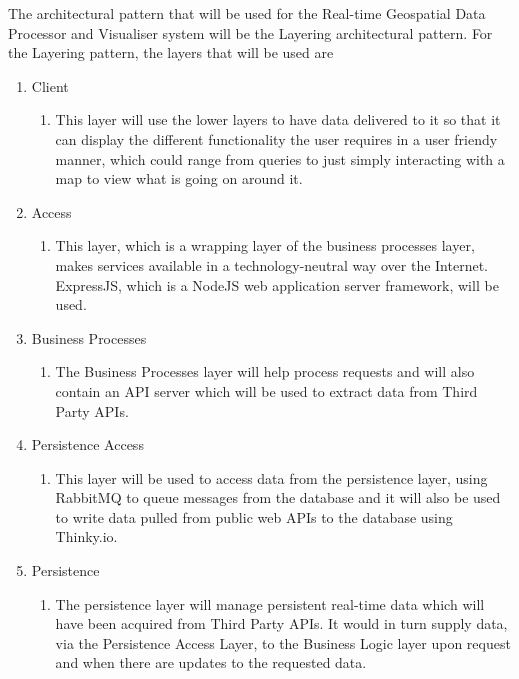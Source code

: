 The architectural pattern that will be used for the Real-time Geospatial Data Processor and Visualiser system will be the Layering architectural pattern. \newline
For the Layering pattern, the layers that will be used are
\begin{enumerate}
	\item Client
		\begin{enumerate}
			\item This layer will use the lower layers to have data delivered to it so that it can display the different functionality the user requires in a user friendy manner, which could range from queries to just simply interacting with a map to view what is going on around it.
		\end{enumerate}
	\item Access
		\begin{enumerate}
			\item This layer, which is a wrapping layer of the business processes layer, makes services available in a technology-neutral way over the Internet. ExpressJS, which is a NodeJS web application server framework, will be used.
		\end{enumerate}
	\item Business Processes
		\begin{enumerate}
			\item The Business Processes layer will help process requests and will also contain an API server which will be used to extract data from Third Party APIs.
		\end{enumerate}
	\item Persistence Access
		\begin{enumerate}
			\item This layer will be used to access data from the persistence layer, using RabbitMQ to queue messages from the database and it will also be used to write data pulled from public web APIs to the database using Thinky.io.
		\end{enumerate}
	\item Persistence
		\begin{enumerate}
			\item The persistence layer will manage persistent real-time data which will have been acquired from Third Party APIs. It would in turn supply data, via the Persistence Access Layer, to the Business Logic layer upon request and when there are updates to the requested data.
		\end{enumerate}
\end{enumerate}


